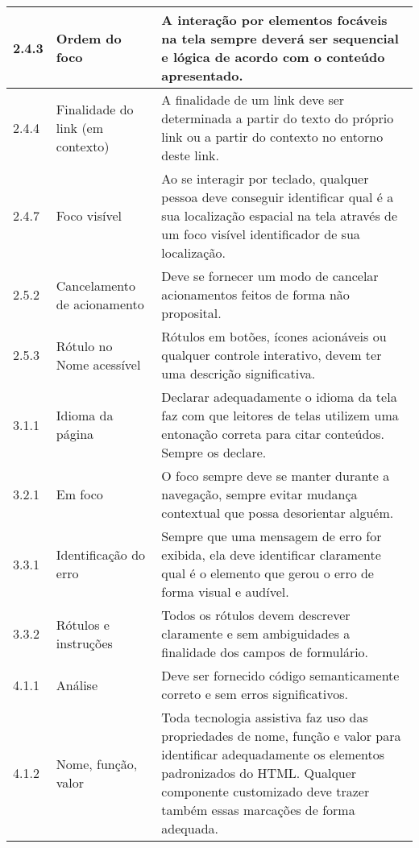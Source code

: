 \begin{appendices}
{\begin{minipage}{\linewidth}
{\begin{tabular}{|l|l|p{400px}|}
    2.4.3 & 
        Ordem do foco & A interação por elementos focáveis na tela sempre deverá ser sequencial e lógica de acordo com o conteúdo apresentado. \\\hline
    2.4.4 & 
        Finalidade do link (em contexto) & A finalidade de um link deve ser determinada a partir do texto do próprio link ou a partir do contexto no entorno deste link. \\\hline
    2.4.7 & 
        Foco visível & Ao se interagir por teclado, qualquer pessoa deve conseguir identificar qual é a sua localização espacial na tela através de um foco visível identificador de sua localização. \\\hline
    2.5.2 & 
        Cancelamento de acionamento & Deve se fornecer um modo de cancelar acionamentos feitos de forma não proposital. \\\hline
    2.5.3 & 
        Rótulo no Nome acessível & Rótulos em botões, ícones acionáveis ou qualquer controle interativo, devem ter uma descrição significativa. \\\hline
    3.1.1 & 
        Idioma da página & Declarar adequadamente o idioma da tela faz com que leitores de telas utilizem uma entonação correta para citar conteúdos. Sempre os declare. \\\hline
    3.2.1 & 
        Em foco & O foco sempre deve se manter durante a navegação, sempre evitar mudança contextual que possa desorientar alguém. \\\hline
    3.3.1 & 
        Identificação do erro & Sempre que uma mensagem de erro for exibida, ela deve identificar claramente qual é o elemento que gerou o erro de forma visual e audível. \\\hline
    3.3.2 & 
        Rótulos e instruções & Todos os rótulos devem descrever claramente e sem ambiguidades a finalidade dos campos de formulário. \\\hline
    4.1.1 & 
        Análise & Deve ser fornecido código semanticamente correto e sem erros significativos. \\\hline
    4.1.2 & 
        Nome, função, valor & Toda tecnologia assistiva faz uso das propriedades de nome, função e valor para identificar adequadamente os elementos padronizados do HTML. Qualquer componente customizado deve trazer também essas marcações de forma adequada. \\ \hline
\end{tabular}
}
\label{Diretrizes nível A}

\end{minipage}

}
\end{appendices}
